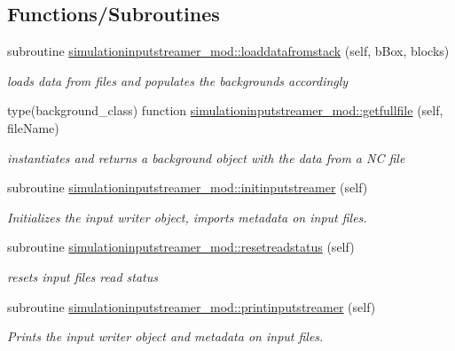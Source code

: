 \subsection*{Functions/\+Subroutines}
\begin{DoxyCompactItemize}
\item 
subroutine \mbox{\hyperlink{namespacesimulationinputstreamer__mod_a3d4540f8e04cc0215895cad65c5be952}{simulationinputstreamer\+\_\+mod\+::loaddatafromstack}} (self, b\+Box, blocks)
\begin{DoxyCompactList}\small\item\em loads data from files and populates the backgrounds accordingly \end{DoxyCompactList}\item 
type(background\+\_\+class) function \mbox{\hyperlink{namespacesimulationinputstreamer__mod_a532b4022fdb6db20d41ca8082d4e7423}{simulationinputstreamer\+\_\+mod\+::getfullfile}} (self, file\+Name)
\begin{DoxyCompactList}\small\item\em instantiates and returns a background object with the data from a NC file \end{DoxyCompactList}\item 
subroutine \mbox{\hyperlink{namespacesimulationinputstreamer__mod_a0e5a1e43fe53f179325858d486a284e5}{simulationinputstreamer\+\_\+mod\+::initinputstreamer}} (self)
\begin{DoxyCompactList}\small\item\em Initializes the input writer object, imports metadata on input files. \end{DoxyCompactList}\item 
subroutine \mbox{\hyperlink{namespacesimulationinputstreamer__mod_a9465e29f527366e5f6d9a1195de6ddee}{simulationinputstreamer\+\_\+mod\+::resetreadstatus}} (self)
\begin{DoxyCompactList}\small\item\em resets input files read status \end{DoxyCompactList}\item 
subroutine \mbox{\hyperlink{namespacesimulationinputstreamer__mod_a1b906bc5ba1fac8d846b30237216aca4}{simulationinputstreamer\+\_\+mod\+::printinputstreamer}} (self)
\begin{DoxyCompactList}\small\item\em Prints the input writer object and metadata on input files. \end{DoxyCompactList}\end{DoxyCompactItemize}
